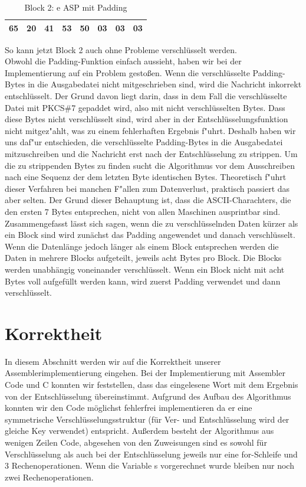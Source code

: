 \documentclass[course=asp]{aspdoc}
\begin{document}
\begin{table}[H]
\centering
    \begin{tabular}{|l|l|l|l|l|l|l|l|}
        \hline
         65 & 20 & 41 & 53 & 50 & 03  & 03 & 03 \\
        \hline
    \end{tabular}
    \caption{Block 2: e ASP mit Padding}
\end{table}
So kann jetzt Block 2 auch ohne Probleme verschlüsselt werden.\\
Obwohl die Padding-Funktion einfach aussieht, haben wir bei der Implementierung auf ein Problem gestoßen. Wenn die verschlüsselte Padding-Bytes in die Ausgabedatei nicht mitgeschrieben sind, wird die Nachricht inkorrekt entschlüsselt. Der Grund davon liegt darin, dass in dem Fall die verschlüsselte Datei mit PKCS\#7 gepaddet wird, also mit nicht verschlüsselten Bytes. Dass diese Bytes nicht verschlüsselt sind, wird aber in der Entschlüsselungsfunktion nicht mitgez"ahlt, was zu einem fehlerhaften Ergebnis f"uhrt. Deshalb haben wir uns daf"ur entschieden, die verschlüsselte Padding-Bytes in die Ausgabedatei mitzuschreiben und die Nachricht erst nach der Entschlüsselung zu strippen. Um die zu strippenden Bytes zu finden sucht die Algorithmus vor dem Ausschreiben nach eine Sequenz der dem letzten Byte identischen Bytes. Theoretisch f"uhrt dieser Verfahren bei manchen F"allen zum Datenverlust, praktisch passiert das aber selten. Der Grund dieser Behauptung ist, dass die ASCII-Charachters, die den ersten 7 Bytes entsprechen, nicht von allen Maschinen ausprintbar sind.\\
Zusammengefasst lässt sich sagen, wenn die zu verschlüsselnden Daten kürzer als ein Block sind wird zunächst das Padding angewendet und danach verschlüsselt. Wenn die Datenlänge jedoch länger als einem Block entsprechen werden die Daten in mehrere Blocks aufgeteilt, jeweils acht Bytes pro Block. Die Blocks werden unabhängig voneinander verschlüsselt. Wenn ein Block nicht mit acht Bytes voll aufgefüllt werden kann, wird zuerst Padding verwendet und dann verschlüsselt.


\newpage
\section{Korrektheit}
In diesem Abschnitt werden wir auf die Korrektheit unserer Assemblerimplementierung eingehen. Bei der Implementierung mit Assembler Code und C konnten wir feststellen, dass das eingelesene Wort mit dem Ergebnis von der Entschlüsselung übereinstimmt. Aufgrund des Aufbau des Algorithmus konnten wir den Code möglichst fehlerfrei implementieren da er eine symmetrische Verschlüsselungsstruktur (für Ver- und Entschlüsselung wird der gleiche Key verwendet) entspricht. Außerdem besteht der Algorithmus aus wenigen Zeilen Code, abgesehen von den Zuweisungen sind es sowohl für Verschlüsselung als auch bei der Entschlüsselung jeweils nur eine for-Schleife und 3 Rechenoperationen. Wenn die Variable s vorgerechnet wurde
bleiben nur noch zwei Rechenoperationen.
\end{document}
